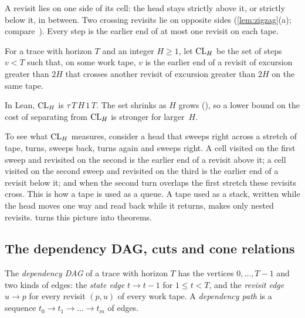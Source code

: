 A revisit lies on one side of its cell: the head stays strictly above it, or strictly below it, in between. Two crossing
revisits lie on opposite sides (\cref{lem:zigzag}(a); compare~\cite[\S2]{EighthPaper2026}). Every step is the earlier end of at most one revisit on each tape.

\begin{definition}\label{def:crossing}
For a trace with horizon $T$ and an integer $H\ge1$, let $\mathrm{CL}_H$ be the set of steps $v<T$ such that, on some work tape, $v$ is
the earlier end of a revisit of excursion greater than $2H$ that crosses another revisit of excursion greater than $2H$ on the same
tape.
\end{definition}

\begin{sloppypar}
In Lean, $\mathrm{CL}_H$ is  $\tau\,T\,H\,1\,T$. The set shrinks as $H$ grows
(), so a lower bound on the cost of separating from $\mathrm{CL}_H$ is stronger for larger~$H$.
\end{sloppypar}

To see what $\mathrm{CL}_H$ measures, consider a head that sweeps right across a stretch of tape, turns, sweeps back, turns again and
sweeps right. A cell visited on the first sweep and revisited on the second is the earlier end of a revisit above it; a cell
visited on the second sweep and revisited on the third is the earlier end of a revisit below it; and when the second turn
overlaps the first stretch these revisits cross. This is how a tape is used as a queue. A tape used as a stack, written while the
head moves one way and read back while it returns, makes only nested revisits.  turns this picture into
theorems.

\subsection{The dependency DAG, cuts and cone relations}

\begin{definition}\label{def:dag}
The \emph{dependency DAG} of a trace with horizon $T$ has the vertices $0,\dots,T-1$ and two kinds of edges: the \emph{state edge}
$t\to t-1$ for $1\le t<T$, and the \emph{revisit edge} $u\to p$ for every revisit $(p,u)$ of every work tape. A \emph{dependency
path} is a sequence $t_0\to t_1\to\dots\to t_m$ of edges.
\end{definition}

